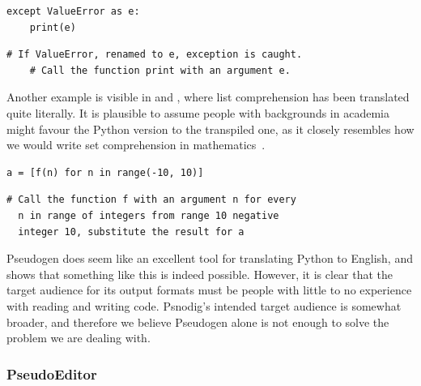 \begin{lstlisting}[caption={Error handling in Python.}, captionpos=b, label={Error handling in Python.}]
except ValueError as e:
    print(e)
\end{lstlisting}

\begin{lstlisting}[caption={The result of transpiling the code in \Cref{Error handling in Python.} with Pseudogen}, captionpos=b, label={Error handling in Pseudogen.}]
# If ValueError, renamed to e, exception is caught.
    # Call the function print with an argument e.
\end{lstlisting}

Another example is visible in  and , where list comprehension has been translated quite literally. It is plausible to assume people with backgrounds in academia might favour the Python version to the transpiled one, as it closely resembles how we would write set comprehension in mathematics~\cite[kapittel 1 et sted, har ikke boka foran meg:/]{setComprehension}. \\

\begin{lstlisting}[caption={A list comprehension of applying f(n) to integers in the range -10 to 10, and placing the results in a list.}, captionpos=b, label={listComprehensionPython}]
a = [f(n) for n in range(-10, 10)]
\end{lstlisting}

\begin{lstlisting}[caption={The result of transpiling the code in \Cref{listComprehensionPython} with Pseudogen}, captionpos=b, label={listComprehensionPseudogen}]
# Call the function f with an argument n for every
  n in range of integers from range 10 negative
  integer 10, substitute the result for a
\end{lstlisting}

Pseudogen does seem like an excellent tool for translating Python to English, and shows that something like this is indeed possible. However, it is clear that the target audience for its output formats must be people with little to no experience with reading and writing code. Psnodig's intended target audience is somewhat broader, and therefore we believe Pseudogen alone is not enough to solve the problem we are dealing with.

\subsubsection{PseudoEditor}


